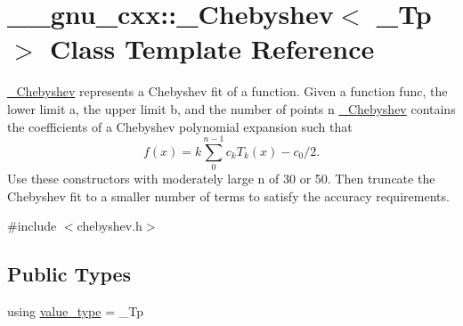 \hypertarget{class____gnu__cxx_1_1__Chebyshev}{}\section{\+\_\+\+\_\+gnu\+\_\+cxx\+:\+:\+\_\+\+Chebyshev$<$ \+\_\+\+Tp $>$ Class Template Reference}
\label{class____gnu__cxx_1_1__Chebyshev}


\hyperlink{class____gnu__cxx_1_1__Chebyshev}{\+\_\+\+Chebyshev} represents a Chebyshev fit of a function. Given a function {\ttfamily func}, the lower limit {\ttfamily a}, the upper limit {\ttfamily b}, and the number of points {\ttfamily n} \hyperlink{class____gnu__cxx_1_1__Chebyshev}{\+\_\+\+Chebyshev} contains the coefficients of a Chebyshev polynomial expansion such that \[ f(x) = k\sum_{0}^{n-1} c_k T_k(x) - c_0/2. \] Use these constructors with moderately large n of 30 or 50. Then truncate the Chebyshev fit to a smaller number of terms to satisfy the accuracy requirements.  




{\ttfamily \#include $<$chebyshev.\+h$>$}

\subsection*{Public Types}
\begin{DoxyCompactItemize}
\item 
using \hyperlink{class____gnu__cxx_1_1__Chebyshev_a7346ba5843311126dc28cb905687c4a1}{value\+\_\+type} = \+\_\+\+Tp
\end{DoxyCompactItemize}
